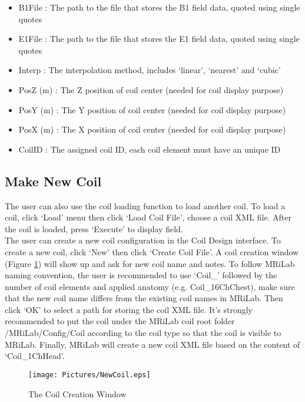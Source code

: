\documentclass{book}%
\begin{document}
\begin{itemize}
	\item B1File : The path to the file that stores the B1 field data, quoted using single quotes
	\item E1File : The path to the file that stores the E1 field data, quoted using single quotes
	\item Interp : The interpolation method, includes `linear', `nearest' and `cubic'
	\item PosZ (m) : The Z position of coil center (needed for coil display purpose)
  \item PosY (m) : The Y position of coil center (needed for coil display purpose)
	\item PosX (m) : The X position of coil center (needed for coil display purpose)
	\item CoilID : The assigned coil ID, each coil element must have an unique  ID
\end{itemize}

\subsection{Make New Coil}

The user can also use the coil loading function to load another coil. To load a coil, click `Load' menu then click `Load Coil File', choose a coil XML file. After the coil is loaded, press `Execute' to display field.\\

The user can create a new coil configuration in the Coil Design interface. To create a new coil, click `New' then click `Create Coil File'. A coil creation window (Figure \ref{fig:NewCoil}) will show up and ask for new coil name and notes. To follow MRiLab naming convention, the user is recommended to use `Coil\_' followed by the number of coil elements and applied anatomy (e.g. Coil\_16ChChest), make sure that the new coil name differs from the existing coil names in MRiLab. Then click `OK' to select a path for storing the coil XML file. It's strongly recommended to put the coil under the MRiLab coil root folder /MRiLab/Config/Coil according to the coil type so that the coil is visible to MRiLab. Finally, MRiLab will create a new coil XML file based on the content of `Coil\_1ChHead'.

\begin{figure}[htbp]
	\centering
		\texttt{[image: Pictures/NewCoil.eps]}
	\caption{The Coil Creation Window}
	\label{fig:NewCoil}
\end{figure}
\end{document}

